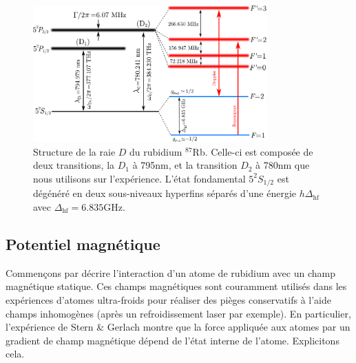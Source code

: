 \begin{figure}
\centering
\includegraphics[width=0.8\textwidth]{Fig/BEC_manip/Rb87.pdf}
\caption{Structure de la raie $D$ du rubidium ${}^{87}$Rb. Celle-ci est composée de deux transitions, la $D_1$ à 795nm, et la transition $D_2$ à 780nm que nous utilisons sur l'expérience. L'état fondamental $5^2S_{1/2}$ est dégénéré en deux sous-niveaux hyperfins séparés d'une énergie $h \Delta_{\mathrm{hf}}$ avec $\Delta_{\mathrm{hf}}=6.835$GHz.}
\label{fig:Rb87}
\end{figure}

\subsection{Potentiel magnétique}
Commençons par décrire l'interaction d'un atome de rubidium avec un champ magnétique statique. Ces champs magnétiques sont couramment utilisés dans les expériences d'atomes ultra-froids pour réaliser des pièges conservatifs à l'aide champs inhomogènes (après un refroidissement laser par exemple). En particulier, l'expérience de Stern \& Gerlach montre que la force appliquée aux atomes par un gradient de champ magnétique dépend de l'état interne de l'atome. Explicitons cela.

